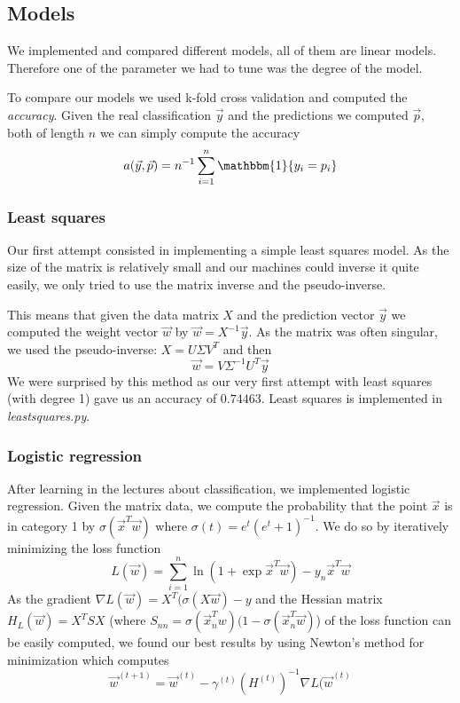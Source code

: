 \documentclass[10pt,conference,compsocconf]{IEEEtran}
\begin{document}
\subsection{Models}
We implemented and compared different models, all of them are linear models. Therefore one of the parameter we had to tune was the degree of the model.

To compare our models we used k-fold cross validation and computed the \textit{accuracy}. Given the real classification $\vec{y}$ and the predictions we computed $\vec{p}$, both of length $n$ we can simply compute the accuracy $$a(\vec{y}, \vec{p}) = n^{-1}\sum_{i=1}^n \mathbbm{1}\{y_i = p_i\}$$

\subsubsection{Least squares}
Our first attempt consisted in implementing a simple least squares model. As the size of the matrix is relatively small and our machines could inverse it quite easily, we only tried to use the matrix inverse and the pseudo-inverse.

This means that given the data matrix $X$ and the prediction vector $\vec{y}$ we computed the weight vector $\vec{w}$ by
$\vec{w} = X^{-1} \vec{y}$. As the matrix was often singular, we used the pseudo-inverse: $X = U \Sigma V^T$ and then
$$\vec{w} = V \Sigma^{-1} U^T \vec{y}$$
We were surprised by this method as our very first attempt with least squares (with degree 1) gave us an accuracy of $0.74463$.
Least squares is implemented in \textit{leastsquares.py}.

\subsubsection{Logistic regression} After learning in the lectures about classification, we implemented logistic regression. Given the matrix data, we compute the probability that the point $\vec{x}$ is in category 1 by $\sigma(\vec{x}^T\vec{w})$ where $\sigma(t) = e^t (e^t + 1)^{-1}$. We do so by iteratively minimizing the loss function
$$L(\vec{w}) = \sum^n_{i=1} \ln(1 + \exp{\vec{x}^T \vec{w}}) - y_n \vec{x}^T\vec{w}$$
As the gradient $\nabla L(\vec{w}) = X^T(\sigma(X\vec{w}) - y$ and the Hessian matrix $H_{L}(\vec{w}) = X^TSX$  (where $S_{nn} = \sigma(\vec{x}_n^T w)(1 - \sigma(\vec{x}_n^T\vec{w})$) of the loss function can be easily computed, we found our best results by using Newton's method for minimization which computes $$\vec{w}^{(t+1)} = \vec{w}^{(t)} - \gamma^{(t)} (H^{(t)})^{-1}\nabla L(\vec{w}^{(t)}$$
\end{document}
